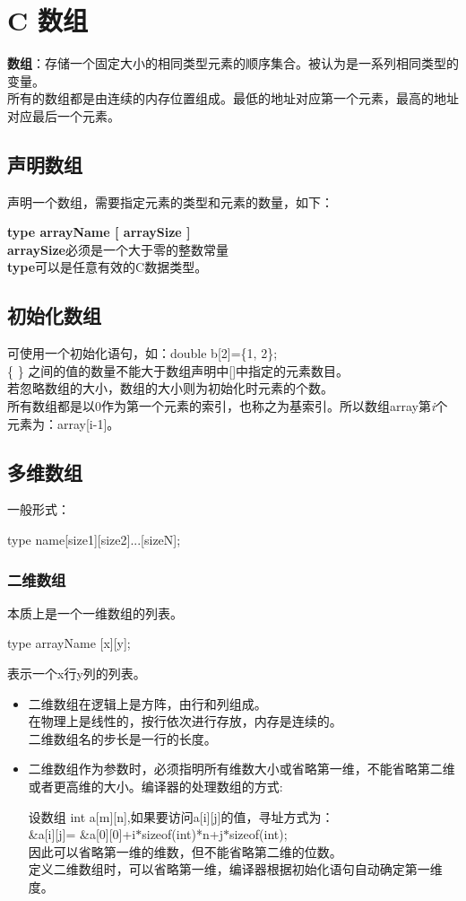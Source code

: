 \documentclass[UTF8]{ctexart}
\begin{document}
	\clearpage
	\section{C 数组}
	\textbf{数组}：存储一个固定大小的相同类型元素的顺序集合。被认为是一系列相同类型的变量。\\
	所有的数组都是由连续的内存位置组成。最低的地址对应第一个元素，最高的地址对应最后一个元素。
	\subsection{声明数组}
	声明一个数组，需要指定元素的类型和元素的数量，如下：\begin{framed}
		\textbf{type arrayName [ arraySize ]}\\
		\textbf{arraySize}必须是一个大于零的整数常量\\
		\textbf{type}可以是任意有效的C数据类型。
	\end{framed}
	\subsection{初始化数组}
	可使用一个初始化语句，如：double b[2]=\{1, 2\};\\
	\{ \} 之间的值的数量不能大于数组声明中[]中指定的元素数目。\\
	若忽略数组的大小，数组的大小则为初始化时元素的个数。\\
	所有数组都是以0作为第一个元素的索引，也称之为基索引。所以数组array第\emph{i}个元素为：array[i-1]。
	\subsection{多维数组}
	一般形式：\begin{framed}
		type name[size1][size2]...[sizeN];
	\end{framed}
	\subsubsection{二维数组}
	本质上是一个一维数组的列表。
	\begin{framed}
		type arrayName [x][y];
	\end{framed}
	表示一个x行y列的列表。
	\begin{framed}
		\begin{itemize}
			\item 二维数组在逻辑上是方阵，由行和列组成。\\在物理上是线性的，按行依次进行存放，内存是连续的。\\二维数组名的步长是一行的长度。
			\item 二维数组作为参数时，必须指明所有维数大小或省略第一维，不能省略第二维或者更高维的大小。编译器的处理数组的方式:\begin{framed}
			设数组 int a[m][n],如果要访问a[i][j]的值，寻址方式为：\\ \&a[i][j]= \&a[0][0]+i$*$sizeof(int)*n+j$*$sizeof(int);\\因此可以省略第一维的维数，但不能省略第二维的位数。\\定义二维数组时，可以省略第一维，编译器根据初始化语句自动确定第一维度。
			\end{framed}
		\end{itemize}
	\end{framed}
\end{document}
